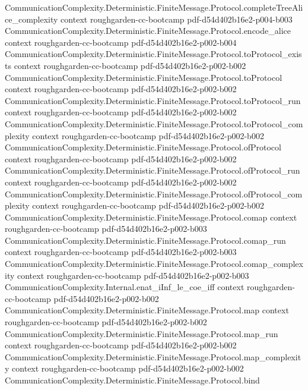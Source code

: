 \begin{theorem}
\proofstep
  {CommunicationComplexity.Deterministic.FiniteMessage.Protocol.completeTreeAlice_complexity}
  {context}
  {roughgarden-cc-bootcamp}
  {pdf-d54d402b16e2-p004-b003}
\proofstep
  {CommunicationComplexity.Deterministic.FiniteMessage.Protocol.encode_alice}
  {context}
  {roughgarden-cc-bootcamp}
  {pdf-d54d402b16e2-p002-b004}
\proofstep
  {CommunicationComplexity.Deterministic.FiniteMessage.Protocol.toProtocol_exists}
  {context}
  {roughgarden-cc-bootcamp}
  {pdf-d54d402b16e2-p002-b002}
\proofstep
  {CommunicationComplexity.Deterministic.FiniteMessage.Protocol.toProtocol}
  {context}
  {roughgarden-cc-bootcamp}
  {pdf-d54d402b16e2-p002-b002}
\proofstep
  {CommunicationComplexity.Deterministic.FiniteMessage.Protocol.toProtocol_run}
  {context}
  {roughgarden-cc-bootcamp}
  {pdf-d54d402b16e2-p002-b002}
\proofstep
  {CommunicationComplexity.Deterministic.FiniteMessage.Protocol.toProtocol_complexity}
  {context}
  {roughgarden-cc-bootcamp}
  {pdf-d54d402b16e2-p002-b002}
\proofstep
  {CommunicationComplexity.Deterministic.FiniteMessage.Protocol.ofProtocol}
  {context}
  {roughgarden-cc-bootcamp}
  {pdf-d54d402b16e2-p002-b002}
\proofstep
  {CommunicationComplexity.Deterministic.FiniteMessage.Protocol.ofProtocol_run}
  {context}
  {roughgarden-cc-bootcamp}
  {pdf-d54d402b16e2-p002-b002}
\proofstep
  {CommunicationComplexity.Deterministic.FiniteMessage.Protocol.ofProtocol_complexity}
  {context}
  {roughgarden-cc-bootcamp}
  {pdf-d54d402b16e2-p002-b002}
\proofstep
  {CommunicationComplexity.Deterministic.FiniteMessage.Protocol.comap}
  {context}
  {roughgarden-cc-bootcamp}
  {pdf-d54d402b16e2-p002-b003}
\proofstep
  {CommunicationComplexity.Deterministic.FiniteMessage.Protocol.comap_run}
  {context}
  {roughgarden-cc-bootcamp}
  {pdf-d54d402b16e2-p002-b003}
\proofstep
  {CommunicationComplexity.Deterministic.FiniteMessage.Protocol.comap_complexity}
  {context}
  {roughgarden-cc-bootcamp}
  {pdf-d54d402b16e2-p002-b003}
\proofstep
  {CommunicationComplexity.Internal.enat_iInf_le_coe_iff}
  {context}
  {roughgarden-cc-bootcamp}
  {pdf-d54d402b16e2-p002-b002}
\proofstep
  {CommunicationComplexity.Deterministic.FiniteMessage.Protocol.map}
  {context}
  {roughgarden-cc-bootcamp}
  {pdf-d54d402b16e2-p002-b002}
\proofstep
  {CommunicationComplexity.Deterministic.FiniteMessage.Protocol.map_run}
  {context}
  {roughgarden-cc-bootcamp}
  {pdf-d54d402b16e2-p002-b002}
\proofstep
  {CommunicationComplexity.Deterministic.FiniteMessage.Protocol.map_complexity}
  {context}
  {roughgarden-cc-bootcamp}
  {pdf-d54d402b16e2-p002-b002}
\proofstep
  {CommunicationComplexity.Deterministic.FiniteMessage.Protocol.bind}

\end{theorem}
